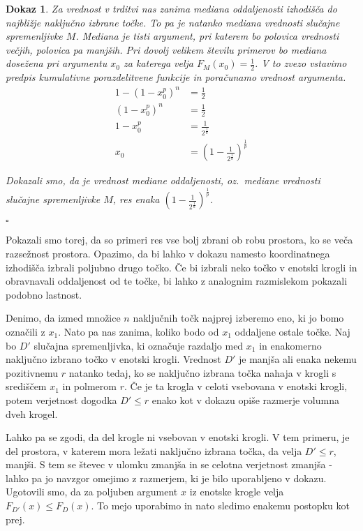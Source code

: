 \documentclass[12pt,a4paper]{article}
\newtheorem{dokaz}{Dokaz}
\begin{document}
\begin{dokaz}
Za vrednost v trditvi nas zanima mediana oddaljenosti izhodišča do najbližje naključno izbrane točke. 
To pa je natanko mediana vrednosti slučajne spremenljivke $M$. 
Mediana je tisti argument, pri katerem bo polovica vrednosti večjih, polovica pa manjših. 
Pri dovolj velikem številu primerov bo mediana dosežena pri argumentu $x_0$ za katerega velja $F_M(x_0) = \frac{1}{2}$. 
V to zvezo vstavimo predpis kumulativne porazdelitvene funkcije in poračunamo vrednost argumenta.
\begin{align*}
1 - (1 - x_0^p)^n & = \frac{1}{2} \\
(1 - x_0^p)^n & = \frac{1}{2} \\
1 - x_0^p & = \frac{1}{2^{\frac{1}{n}}} \\
x_0 & = (1 - \frac{1}{2^{\frac{1}{n}}})^{\frac{1}{p}}
\end{align*}

Dokazali smo, da je vrednost mediane oddaljenosti, oz.~mediane vrednosti slučajne spremenljivke $M$, res enaka $(1 - \frac{1}{2^{\frac{1}{n}}})^{\frac{1}{p}}$.

\begin{flushright}
$\square$
\end{flushright}

\end{dokaz}

Pokazali smo torej, da so primeri res vse bolj zbrani ob robu prostora, ko se veča razsežnost prostora. 
Opazimo, da bi lahko v dokazu namesto koordinatnega izhodišča izbrali poljubno drugo točko. 
Če bi izbrali neko točko v enotski krogli in obravnavali oddaljenost od te točke, bi lahko z analognim razmislekom pokazali podobno lastnost.

Denimo, da izmed množice $n$ naključnih točk najprej izberemo eno, ki jo bomo označili z $x_1$. 
Nato pa nas zanima, koliko bodo od $x_1$ oddaljene ostale točke. 
Naj bo $D'$ slučajna spremenljivka, ki označuje razdaljo med $x_1$ in enakomerno naključno izbrano točko v enotski krogli. 
Vrednost $D'$ je manjša ali enaka nekemu pozitivnemu $r$ natanko tedaj, ko se naključno izbrana točka nahaja v krogli s središčem $x_1$ in polmerom $r$. 
Če je ta krogla v  celoti vsebovana v enotski krogli, potem verjetnost dogodka $D' \leq r$ enako kot v dokazu opiše razmerje volumna dveh krogel. 

Lahko pa se zgodi, da del krogle ni vsebovan v enotski krogli. 
V tem primeru, je del prostora, v katerem mora ležati naključno izbrana točka, da velja $D' \leq r$, manjši. 
S tem se števec v ulomku zmanjša in se celotna verjetnost zmanjša - lahko pa jo navzgor omejimo z razmerjem, ki je bilo uporabljeno v dokazu. 
Ugotovili smo, da za poljuben argument $x$ iz enotske krogle velja $F_{D'}(x) \leq F_D(x)$. To mejo uporabimo in nato sledimo enakemu postopku kot prej.
\end{document}
